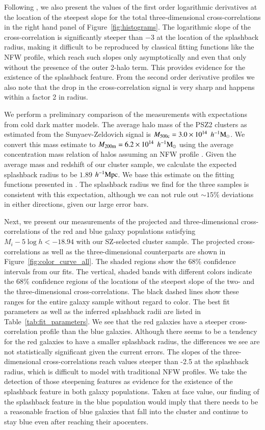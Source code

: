 \documentclass[iop, apjl, twocolappendix, numberedappendix]{emulateapj}
\def\mpch{h^{-1}{\rm Mpc}}
\def\msunh{h^{-1}{\rm M_{\odot}}}
\begin{document}
Following \citet{baxter2017halo}, we also present the values of the
first order logarithmic derivatives at the location of the steepest slope for
the total three-dimensional cross-correlations in the right hand panel of
Figure~\ref{fig:histograms}. The logarithmic slope of the
cross-correlation is significantly steeper than $-3$ at the location
of the splashback radius, making it difficult to
be reproduced by classical fitting functions like the NFW profile,
which reach such slopes only asymptotically and even that only
without the presence of the outer 2-halo term. This provides
evidence for the existence of the splashback feature. From the second
order derivative profiles we also note that the drop in the cross-correlation
signal is very sharp and happens within a factor 2 in radius.

We perform a preliminary comparison of the measurements with
expectations from cold dark matter models. The average halo mass of
the PSZ2 clusters as estimated from the Sunyaev-Zeldovich signal
is $M_{\rm 500c}=3.0\times10^{14}$ $\msunh$. We convert this mass
estimate to $M_{\rm 200m}=6.2\times10^{14}$ $\msunh$ using the average
concentration mass relation of halos assuming an NFW profile
\citep{HuKravtsov:2003}. Given the average mass and redshift of our
cluster sample, we calculate the expected splashback radius to be
$1.89$ $\mpch$. We base this estimate on the fitting functions
presented in \citet{more2015splashback}. The splashback radius we
find for the three samples is consistent with this expectation,
although we can not rule out $\sim 15\%$ deviations in either directions,
given our large error bars.

Next, we present our measurements of the projected and
three-dimensional cross-correlations of the red and blue galaxy populations
satisfying $M_{i}-5\log h<-18.94$ with our SZ-selected cluster
sample. The projected cross-correlations as well as the three-dimensional
counterparts are shown in Figure~\ref{fig:color_curve_all}. The shaded regions show
the 68\% confidence intervals from our fits. The vertical, shaded
bands with different colors indicate the 68\% confidence regions of
the locations of the steepest slope of the two- and the
three-dimensional cross-correlations. The black dashed lines show
these ranges for the entire galaxy sample without regard to color.
The best fit parameters as well as the inferred splashback radii are
listed in Table~\ref{tab:fit_parameters}. We
see that the red galaxies have a steeper cross-correlation profile
than the blue galaxies. Although there seems to be  a tendency for the red
galaxies to have a smaller splashback radius, the differences we see
are not statistically significant given the current errors. The
slopes of the three-dimensional cross-correlations reach values
steeper than -2.5 at the splashback radius, which is difficult to model with
traditional NFW profiles. We take the detection of those steepening features
as evidence for the existence of the splashback feature in both galaxy populations.
Taken at face value, our finding of the splashback feature in the blue
population would imply that there needs to be a reasonable fraction of
blue galaxies that fall into the cluster and continue to stay blue
even after reaching their apocenters.
\end{document}
